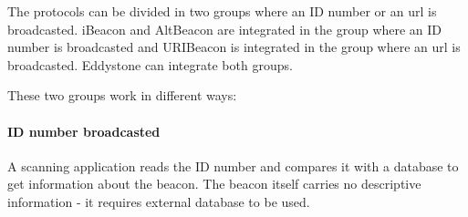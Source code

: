 \begin{table}[!htb]
  \renewcommand{\arraystretch}{2} %
  \centering
  \caption[Beacons Protocols.]{Beacons Protocols.}
  \label{tab:protocolsdif}
\end{table}

The protocols can be divided in two groups where an ID number or an \gls{url} is broadcasted. iBeacon and AltBeacon are integrated in the group where an ID number is broadcasted and URIBeacon is integrated in the group where an \gls{url} is broadcasted. Eddystone can integrate both groups.

These two groups work in different ways:
\paragraph{ID number broadcasted}
\label{paragraph:sidnumber}
A scanning application reads the ID number and compares it with a database to get information about the beacon.
The beacon itself carries no descriptive information - it requires external database to be used. 

